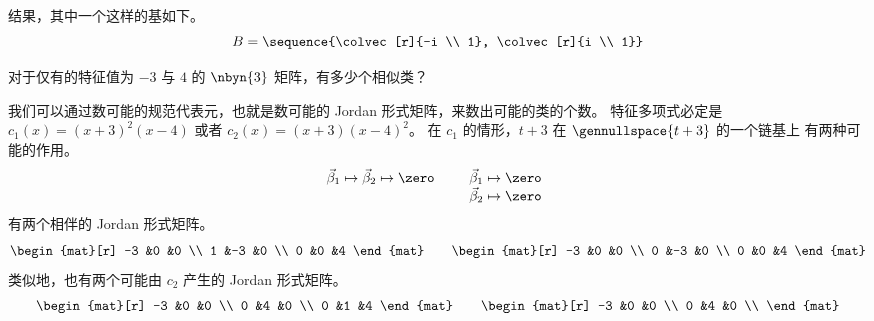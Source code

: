 \begin{exercises}
\begin{answer}
       结果，其中一个这样的基如下。
       \begin{equation*}
         B=\sequence{\colvec[r]{-i \\ 1},
                     \colvec[r]{i \\ 1}}
       \end{equation*}  
     \end{answer}
  \item 
    对于仅有的特征值为 \( -3 \) 与 \( 4 \) 的
    \( \nbyn{3} \) 矩阵，有多少个相似类？
    \begin{answer}
     我们可以通过数可能的规范代表元，也就是数可能的
     Jordan 形式矩阵，来数出可能的类的个数。
     特征多项式必定是 $c_1(x)=(x+3)^2(x-4)$
     或者 $c_2(x)=(x+3)(x-4)^2$。
     在 $c_1$ 的情形，$t+3$ 在 $\gennullspace{t+3}$ 的一个链基上
     有两种可能的作用。
     \begin{equation*}
       \vec{\beta}_1\mapsto\vec{\beta}_2\mapsto \zero
       \qquad
       \begin{array}[t]{l}
         \vec{\beta}_1\mapsto\zero \\
         \vec{\beta}_2\mapsto\zero 
       \end{array}
     \end{equation*}
     有两个相伴的 Jordan 形式矩阵。
     \begin{equation*}
        \begin{mat}[r]
          -3  &0  &0  \\
           1  &-3 &0  \\
           0  &0  &4
        \end{mat}
        \qquad
        \begin{mat}[r]
          -3  &0  &0  \\
           0  &-3 &0  \\
           0  &0  &4
        \end{mat}
      \end{equation*}
      类似地，也有两个可能由 $c_2$ 产生的
      Jordan 形式矩阵。
      \begin{equation*}
        \begin{mat}[r]
          -3  &0  &0  \\
           0  &4  &0  \\
           0  &1  &4
        \end{mat}
        \qquad
        \begin{mat}[r]
          -3  &0  &0  \\
           0  &4  &0  \\

\end{mat}
\end{equation*}
\end{answer}
\end{exercises}
